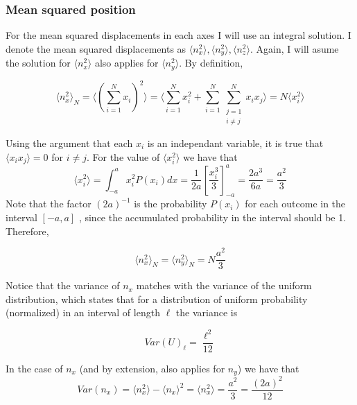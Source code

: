 \documentclass{article}
\begin{document}
\subsubsection*{Mean squared position}

For the mean squared displacements in each axes I will use an integral solution.  I denote the mean squared displacements as $\langle n_x^2\rangle ,\langle n_y^2 \rangle,\langle n_z^2\rangle$. Again, I will asume the solution for  $\langle n_x^2\rangle$ also applies for $\langle n_y^2\rangle$. By definition,

\begin{equation}
    \langle n_x^2\rangle_N = \langle \left(\sum_{i=1}^N x_i\right)^2 \rangle = \langle \sum_{i=1}^N x_i^2 + \sum_{i=1}^N \sum_{\substack{j=1\\i\neq j}}^N x_i x_j \rangle = N \langle x_i^2 \rangle 
\end{equation}

Using the argument that each $x_i$ is an independant variable, it is true that  $\langle x_i x_j \rangle = 0 $ for $i \neq j$. For the value of $\langle x_i^2\rangle$ we have that
\begin{equation}
    \langle x_i^2\rangle =  \int_{-a}^{a} x_i^2 P(x_i) dx = \frac{1}{2a} \left[ \frac{x_i^3}{3} \right]_{-a}^{a} = \frac{2a^3}{6a} = \frac{a^2}{3}
\end{equation}
Note that the factor $(2a)^{-1}$ is the probability $P(x_i)$ for each outcome in the interval $[-a,a]$ , since the accumulated probability in the interval should be 1. Therefore,

\begin{equation}
    \langle n_x^2\rangle_N =\langle n_y^2\rangle_N = N\frac{a^2}{3}
\end{equation}

Notice that the variance of  $n_x$ matches with the variance of the uniform distribution, which states that for a distribution of uniform probability (normalized) in an interval of length $\ell$ the variance is

\begin{equation}
    Var(U)_{\ell} = \frac{\ell^2}{12}
\end{equation}

In the case of $n_x$ (and by extension, also applies for $n_y$) we have that
\begin{equation}
Var(n_x) = \langle n_x^2 \rangle - \langle n_x \rangle^2 = \langle n_x^2 \rangle = \frac{a^2}{3}  = \frac{(2a)^2}{12} 
\end{equation}
\end{document}
